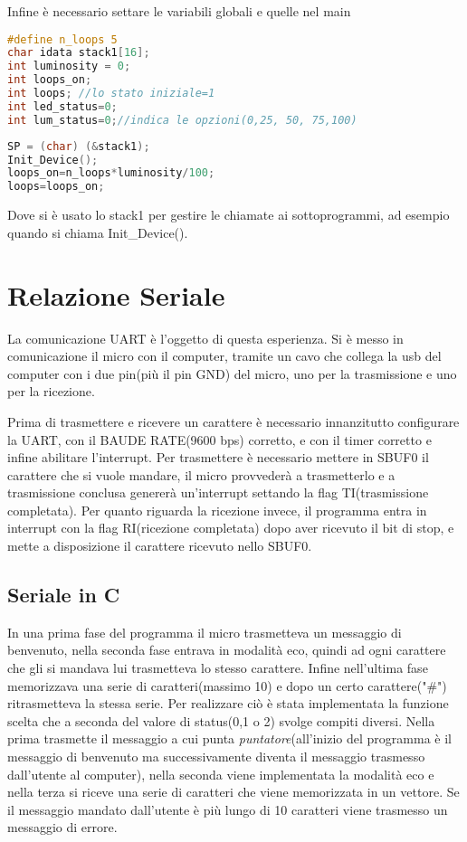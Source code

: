 \documentclass[main.tex]{subfiles}
\begin{document}
Infine è necessario settare le variabili globali e quelle nel main
\begin{lstlisting}[language=C,caption=Variabili globali]
#define n_loops 5
char idata stack1[16];
int luminosity = 0;
int loops_on;
int loops; //lo stato iniziale=1
int led_status=0;
int lum_status=0;//indica le opzioni(0,25, 50, 75,100)
\end{lstlisting}
\begin{lstlisting}[language=C,caption=main]
SP = (char) (&stack1);
Init_Device();
loops_on=n_loops*luminosity/100;
loops=loops_on;
\end{lstlisting}
Dove si è usato lo stack1 per gestire le chiamate ai sottoprogrammi, ad esempio quando si chiama Init\_Device().


\section{Relazione Seriale}
La comunicazione UART è l'oggetto di questa esperienza. Si è messo in comunicazione il micro con il computer, tramite un cavo che collega la usb del computer con i due pin(più il pin GND) del micro, uno per la trasmissione e uno per la ricezione.

Prima di trasmettere e ricevere un carattere è necessario innanzitutto configurare la UART, con il BAUDE RATE(9600 bps) corretto, e con il timer corretto e infine abilitare l'interrupt.  
Per trasmettere è necessario mettere in SBUF0 il carattere che si vuole mandare, il micro provvederà a trasmetterlo e a trasmissione conclusa genererà un'interrupt settando la flag TI(trasmissione completata). Per quanto riguarda la ricezione invece, il programma entra in interrupt con la flag RI(ricezione completata) dopo aver ricevuto il bit di stop, e mette a disposizione il carattere ricevuto nello SBUF0.  

\subsection{Seriale in C}

In una prima fase del programma il micro trasmetteva un messaggio di benvenuto, nella seconda fase entrava in modalità eco, quindi ad ogni carattere che gli si mandava lui trasmetteva lo stesso carattere. Infine nell'ultima fase memorizzava una serie di caratteri(massimo 10) e dopo un certo carattere("\#") ritrasmetteva la stessa serie. Per realizzare ciò è stata implementata la funzione scelta che a seconda del valore di status(0,1 o 2) svolge compiti diversi. Nella prima trasmette il messaggio a cui punta \textit{puntatore}(all'inizio del programma è il messaggio di benvenuto ma successivamente diventa il messaggio trasmesso dall'utente al computer), nella seconda viene implementata la modalità eco e nella terza si riceve una serie di caratteri che viene memorizzata in un vettore. Se il messaggio mandato dall'utente è più lungo di 10 caratteri viene trasmesso un messaggio di errore.
\end{document}
